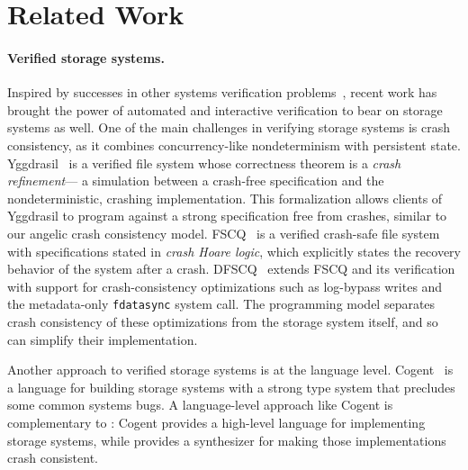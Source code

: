 \section{Related Work}\label{s:related}

\paragraph{Verified storage systems.}
Inspired by successes in other systems verification problems~\cite{leroy:compcert,klein:sel4},
recent work has brought the power of automated and interactive verification
to bear on storage systems as well.
One of the main challenges in verifying storage systems is crash consistency,
as it combines concurrency-like nondeterminism with persistent state.
Yggdrasil~\cite{sigurbjarnarson:yggdrasil} is a verified file system
whose correctness theorem is a \emph{crash refinement}---%
a simulation between a crash-free specification and the nondeterministic, crashing implementation.
This formalization allows clients of Yggdrasil to program against a strong specification free from crashes,
similar to our angelic crash consistency model.
FSCQ~\cite{chen:fscq} is a verified crash-safe file system
with specifications stated in \emph{crash Hoare logic},
which explicitly states the recovery behavior of the system after a crash.
DFSCQ~\cite{chen:dfscq} extends FSCQ and its verification
with support for crash-consistency optimizations such as log-bypass writes
and the metadata-only \texttt{fdatasync} system call.
The \depsynth programming model separates crash consistency of these optimizations from the storage system itself,
and so can simplify their implementation.

Another approach to verified storage systems is at the language level.
Cogent~\cite{amani:cogent} is a language for building storage systems
with a strong type system that precludes some common systems bugs.
A language-level approach like Cogent is complementary to \depsynth:
Cogent provides a high-level language for implementing storage systems,
while \depsynth provides a synthesizer for making those implementations crash consistent.

